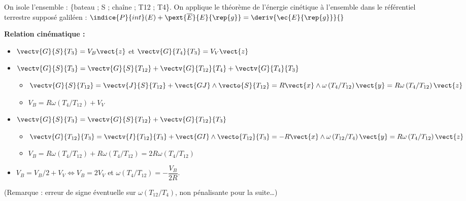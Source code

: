 \begin{multicols}{2}
\ifprof
\begin{corrige}
\end{corrige}
\else
\fi


	 
On isole l'ensemble : \{bateau ; S ; chaîne ; T12 ; T4\}. On applique le théorème de l'énergie cinétique à l’ensemble dans le référentiel terrestre supposé galiléen : 
$\indice{P}{int}(E)+ \pext{\overline{E}}{E}{\rep{g}} = \deriv{\ec{E}{\rep{g}}}{}$

\textbf{Relation cinématique :}
\begin{itemize}
	\item $\vectv{G}{S}{T_3}=V_B \vect{z}$ et $\vectv{G}{T_4}{T_{3}}=V_V \vect{z}$
	\item $\vectv{G}{S}{T_3}=\vectv{G}{S}{T_{12}}+\vectv{G}{T_{12}}{T_{4}}+\vectv{G}{T_4}{T_{3}}$
\begin{itemize}
	\item $\vectv{G}{S}{T_{12}}=\vectv{J}{S}{T_{12}}+\vect{GJ}\wedge\vecto{S}{T_{12}}=R\vect{x}\wedge \omega\left({T_{4}}/{T_{12}}\right) \vect{y}=R\omega\left({T_{4}}/{T_{12}}\right) \vect{z}$
	\item $V_B=R\omega\left({T_{4}}/{T_{12}}\right)+V_V$
\end{itemize}
	\item $\vectv{G}{S}{T_3}=\vectv{G}{S}{T_{12}}+\vectv{G}{T_{12}}{T_{3}}$
\begin{itemize}
	\item $\vectv{G}{T_{12}}{T_{3}}=\vectv{I}{T_{12}}{T_{3}}+\vect{GI}\wedge\vecto{T_{12}}{T_{3}}=-R\vect{x}\wedge \omega\left({T_{12}}/{T_{4}}\right)\vect{y}=R\omega\left({T_{4}}/{T_{12}}\right) \vect{z}$
	\item $V_B=R\omega\left({T_{4}}/{T_{12}}\right)+R\omega\left({T_{4}}/{T_{12}}\right)=2R\omega\left({T_{4}}/{T_{12}}\right)$
\end{itemize}
	\item $V_B=V_B/2+V_V\Longleftrightarrow V_B=2V_V$ et $\omega\left({T_{4}}/{T_{12}}\right)=-\dfrac{V_B}{2R}$.	 
\end{itemize}


(Remarque : erreur de signe éventuelle sur $\omega\left({T_{12}}/{T_{4}}\right)$, non pénalisante pour la suite…)


\end{multicols}
